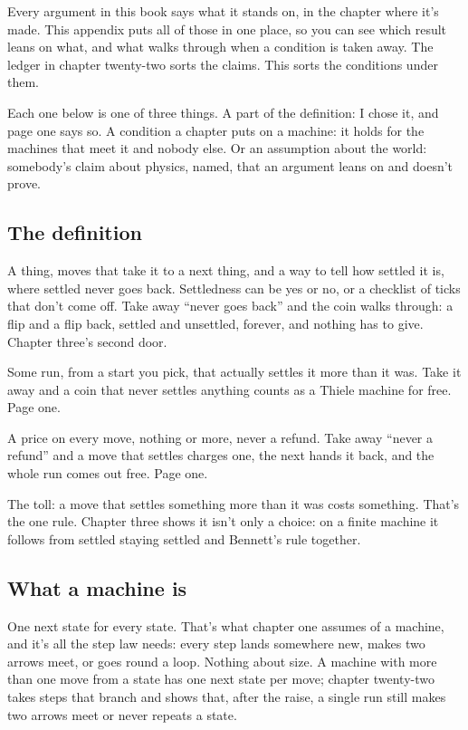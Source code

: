 \documentclass[11pt,twoside]{article}
\theoremstyle{thielethm}
\theoremstyle{thieledef}
\theoremstyle{thieledef}
\theoremstyle{thieledef}
\theoremstyle{thielethm}
\theoremstyle{thieleobs}
\theoremstyle{thielethm}
\begin{document}
Every argument in this book says what it stands on, in the chapter where it's made. This appendix puts all of those in one place, so you can see which result leans on what, and what walks through when a condition is taken away. The ledger in chapter twenty-two sorts the claims. This sorts the conditions under them.

Each one below is one of three things. A part of the definition: I chose it, and page one says so. A condition a chapter puts on a machine: it holds for the machines that meet it and nobody else. Or an assumption about the world: somebody's claim about physics, named, that an argument leans on and doesn't prove.

\subsection{The definition}

A thing, moves that take it to a next thing, and a way to tell how settled it is, where settled never goes back. Settledness can be yes or no, or a checklist of ticks that don't come off. Take away ``never goes back'' and the coin walks through: a flip and a flip back, settled and unsettled, forever, and nothing has to give. Chapter three's second door.

Some run, from a start you pick, that actually settles it more than it was. Take it away and a coin that never settles anything counts as a Thiele machine for free. Page one.

A price on every move, nothing or more, never a refund. Take away ``never a refund'' and a move that settles charges one, the next hands it back, and the whole run comes out free. Page one.

The toll: a move that settles something more than it was costs something. That's the one rule. Chapter three shows it isn't only a choice: on a finite machine it follows from settled staying settled and Bennett's rule together.

\subsection{What a machine is}

One next state for every state. That's what chapter one assumes of a machine, and it's all the step law needs: every step lands somewhere new, makes two arrows meet, or goes round a loop. Nothing about size. A machine with more than one move from a state has one next state per move; chapter twenty-two takes steps that branch and shows that, after the raise, a single run still makes two arrows meet or never repeats a state.
\end{document}
